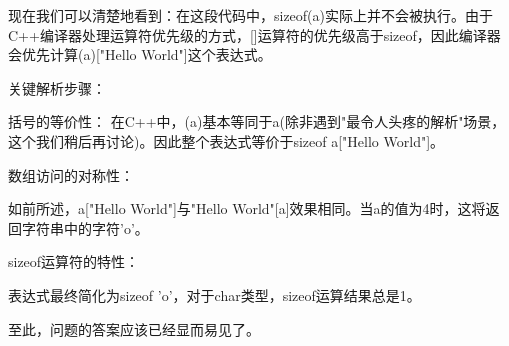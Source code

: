 现在我们可以清楚地看到：在这段代码中，sizeof(a)实际上并不会被执行。由于C++编译器处理运算符优先级的方式，[]运算符的优先级高于sizeof，因此编译器会优先计算(a)["Hello World"]这个表达式。

关键解析步骤：

括号的等价性：
在C++中，(a)基本等同于a(除非遇到"最令人头疼的解析"场景，这个我们稍后再讨论)。因此整个表达式等价于sizeof a["Hello World"]。

数组访问的对称性：

如前所述，a["Hello World"]与"Hello World"[a]效果相同。当a的值为4时，这将返回字符串中的字符'o'。

sizeof运算符的特性：

表达式最终简化为sizeof 'o'，对于char类型，sizeof运算结果总是1。

至此，问题的答案应该已经显而易见了。